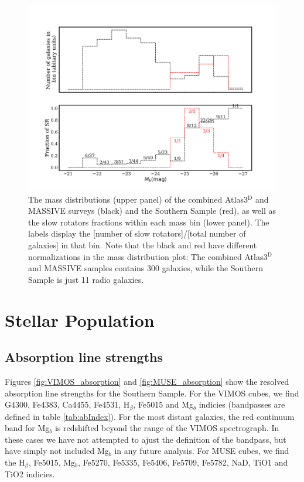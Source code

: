 {{		

		\begin{figure}
			\centering
			\includegraphics[width=\textwidth]{chapter4/M_k_binned.png}
			\caption[Mass matching global kinematics]{The mass distributions (upper panel) of the combined Atlas3$^\text{D}$ and MASSIVE surveys (black) and the Southern Sample (red), as well as the slow rotators fractions within each mass bin (lower panel). The labels display the [number of slow rotators]/[total number of galaxies] in that bin. Note that the black and red have different normalizations in the mass distribution plot: The combined Atlas3$^\text{D}$ and MASSIVE samples contains 300 galaxies, while the Southern Sample is just 11 radio galaxies.}
			\label{fig:SRmassFraction}
		\end{figure}


		





\section{Stellar Population}
	\label{sec:pop}

	\subsection{Absorption line strengths}
		\label{subsec:absorption}
		Figures \ref{fig:VIMOS_absorption} and \ref{fig:MUSE_absorption} show the resolved absorption line strengths for the Southern Sample. For the VIMOS cubes, we find G4300, Fe4383, Ca4455, Fe4531, H$_\beta$, Fe5015 and Mg$_b$ indicies (bandpasses are defined in table \ref{tab:abIndex}). For the most distant galaxies, the red continuum band for Mg$_b$ is redshifted beyond the range of the VIMOS spectrograph. In these cases we have not attempted to ajust the definition of the bandpass, but have simply not included Mg$_b$ in any future analysis. For MUSE cubes, we find the H$_\beta$, Fe5015, Mg$_b$, Fe5270, Fe5335, Fe5406, Fe5709, Fe5782, NaD, TiO1 and TiO2 indicies. 

}}
